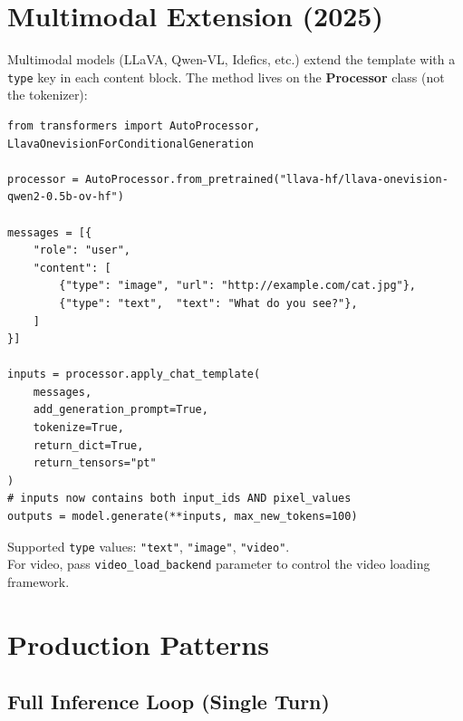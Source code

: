 \documentclass[11pt,a4paper]{article}
\newcommand{\val}[1]{\texttt{\color{codeGreen}#1}}
\begin{document}
\section{Multimodal Extension (2025)}

Multimodal models (LLaVA, Qwen-VL, Idefics, etc.) extend the template with a \texttt{type} key in each content block. The method lives on the \textbf{Processor} class (not the tokenizer):

\begin{lstlisting}[style=pycode]
from transformers import AutoProcessor, LlavaOnevisionForConditionalGeneration

processor = AutoProcessor.from_pretrained("llava-hf/llava-onevision-qwen2-0.5b-ov-hf")

messages = [{
    "role": "user",
    "content": [
        {"type": "image", "url": "http://example.com/cat.jpg"},
        {"type": "text",  "text": "What do you see?"},
    ]
}]

inputs = processor.apply_chat_template(
    messages,
    add_generation_prompt=True,
    tokenize=True,
    return_dict=True,
    return_tensors="pt"
)
# inputs now contains both input_ids AND pixel_values
outputs = model.generate(**inputs, max_new_tokens=100)
\end{lstlisting}

\noindent Supported \texttt{type} values: \val{"text"}, \val{"image"}, \val{"video"}.\\
For video, pass \texttt{video\_load\_backend} parameter to control the video loading framework.

\section{Production Patterns}

\subsection{Full Inference Loop (Single Turn)}
\end{document}
